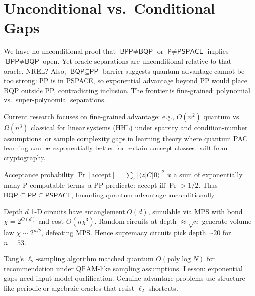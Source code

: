\section{Unconditional vs.\ Conditional Gaps}
We have no unconditional proof that $\textsf{BPP}\neq\textsf{BQP}$ or $\textsf{P}\neq\textsf{PSPACE}$ implies $\textsf{BPP}\neq\textsf{BQP}$ open. Yet oracle separations are unconditional relative to that oracle. NREL? Also, $\textsf{BQP}\subseteq\textsf{PP}$ barrier suggests quantum advantage cannot be too strong: PP is in PSPACE, so exponential advantage beyond PP would place BQP outside PP, contradicting inclusion. The frontier is fine-grained: polynomial vs.\ super-polynomial separations.

Current research focuses on fine-grained advantage: e.g., $O(n^2)$ quantum vs.\ $\Omega(n^3)$ classical for linear systems (HHL) under sparsity and condition-number assumptions, or sample complexity gaps in learning theory where quantum PAC learning can be exponentially better for certain concept classes built from cryptography.


\begin{remark}[BQP in PP]
Acceptance probability $\Pr[\text{accept}]=\sum_z|\langle z|C|0\rangle|^2$ is a sum of exponentially many P-computable terms, a PP predicate: accept iff $\Pr>1/2$. Thus $\textsf{BQP}\subseteq\textsf{PP}\subseteq\textsf{PSPACE}$, bounding quantum advantage unconditionally.
\end{remark}

\begin{example}
Depth $d$ 1-D circuits have entanglement $O(d)$, simulable via MPS with bond $\chi=2^{O(d)}$ and cost $O(n\chi^3)$. Random circuits at depth $\approx\sqrt n$ generate volume law $\chi\sim2^{n/2}$, defeating MPS. Hence supremacy circuits pick depth $\sim20$ for $n=53$.
\end{example}

\begin{remark}[Dequantization]
Tang's $\ell_2$-sampling algorithm matched quantum $O(\mathrm{poly}\log N)$ for recommendation under QRAM-like sampling assumptions. Lesson: exponential gaps need input-model qualification. Genuine advantage problems use structure like periodic or algebraic oracles that resist $\ell_2$ shortcuts.
\end{remark}

